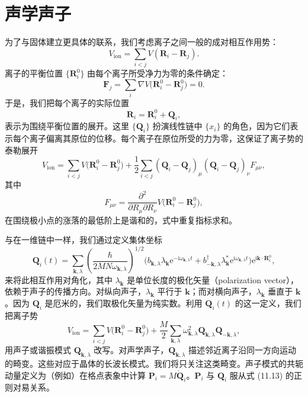 \section{声学声子}

为了与固体建立更具体的联系，我们考虑离子之间一般的成对相互作用势：
\begin{equation*}
V_{\mathrm{ion}}=\sum_{i<j}V(\mathbf{R}_i-\mathbf{R}_j).\tag{11.19}
\end{equation*}
离子的平衡位置 $\{\mathbf{R}_i^0\}$ 由每个离子所受净力为零的条件确定：
\begin{equation*}
\mathbf{F}_j=\sum_i\nabla V\bigl(\mathbf{R}_i^0-\mathbf{R}_j^0\bigr)=0.\tag{11.20}
\end{equation*}
于是，我们把每个离子的实际位置
\begin{equation*}
\mathbf{R}_i=\mathbf{R}_i^0+\mathbf{Q}_i,\tag{11.21}
\end{equation*}
表示为围绕平衡位置的展开。这里 $\{\mathbf{Q}_i\}$ 扮演线性链中 $\{x_i\}$ 的角色，因为它们表示每个离子偏离其原位的位移。每个离子在原位所受的力为零，这保证了离子势的泰勒展开
\begin{equation*}
V_{\mathrm{ion}}=\sum_{i<j}V\bigl(\mathbf{R}_i^0-\mathbf{R}_j^0\bigr)+\frac{1}{2}\sum_{i<j}(\mathbf{Q}_i-\mathbf{Q}_j)_{\mu}(\mathbf{Q}_i-\mathbf{Q}_j)_{\nu}F_{\mu\nu},\tag{11.22}
\end{equation*}
其中
\begin{equation*}
F_{\mu\nu}=\frac{\partial^2}{\partial R_{\mu}\partial R_{\nu}}V\bigl(\mathbf{R}_i^0-\mathbf{R}_j^0\bigr),\tag{11.23}
\end{equation*}
在围绕极小点的涨落的最低阶上是谐和的，式中重复指标求和。

与在一维链中一样，我们通过定义集体坐标
\begin{equation*}
\mathbf{Q}_i(t)=\sum_{\mathbf{k},\lambda}\left(\frac{\hbar}{2MN\omega_{\mathbf{k},\lambda}}\right)^{1/2}\bigl(b_{\mathbf{k},\lambda}\lambda_{\mathbf{k}}\mathrm{e}^{-\mathrm{i}\omega_{\mathbf{k},\lambda}t}+b_{-\mathbf{k},\lambda}^{\dagger}\lambda_{\mathbf{k}}^{*}\mathrm{e}^{\mathrm{i}\omega_{\mathbf{k},\lambda}t}\bigr)\mathrm{e}^{\mathrm{i}\mathbf{k}\cdot\mathbf{R}_i^0},
\end{equation*}
来将此相互作用对角化，其中 $\lambda_{\mathbf{k}}$ 是单位长度的极化矢量（polarization vector），依赖于声子的传播方向。对纵向声子，$\lambda_{\mathbf{k}}$ 平行于 $\mathbf{k}$；而对横向声子，$\lambda_{\mathbf{k}}$ 垂直于 $\mathbf{k}$。因为 $\mathbf{Q}_i$ 是厄米的，我们取极化矢量为纯实数。利用 $\mathbf{Q}_i(t)$ 的这一定义，我们把离子势
\begin{equation*}
V_{\mathrm{ion}}=\sum_{i<j}V\bigl(\mathbf{R}_i^0-\mathbf{R}_j^0\bigr)+\frac{M}{2}\sum_{\mathbf{k},\lambda}\omega_{\mathbf{k},\lambda}^2\mathbf{Q}_{\mathbf{k},\lambda}\mathbf{Q}_{-\mathbf{k},\lambda},\tag{11.24}
\end{equation*}
用声子或谐振模式 $\mathbf{Q}_{\mathbf{k},\lambda}$ 改写。对声学声子，$\mathbf{Q}_{\mathbf{k},\lambda}$ 描述邻近离子沿同一方向运动的畸变。这些对应于晶体的长波长模式。我们将只关注这类畸变。声子模式的共轭动量定义为（例如）在格点表象中计算 $\mathbf{P}_i=M\dot{\mathbf{Q}}_i$。$\mathbf{P}_i$ 与 $\mathbf{Q}_i$ 服从式 (11.13) 的正则对易关系。


